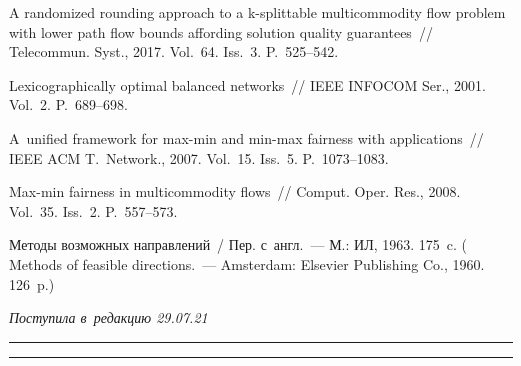 \begin{multicols}{2}
{{\begin{thebibliography}{9}
 A randomized rounding approach to a k-splittable 
multicommodity flow problem with lower path flow bounds affording solution 
quality guarantees~// Telecommun. Syst., 2017. Vol.~64. Iss.~3. P.~525--542.

Lexicographically optimal balanced networks~// IEEE \mbox{INFOCOM} Ser., 2001. 
Vol.~2.  P.~689--698.

  A~unified 
framework for max-min and min-max fairness with applications~// IEEE ACM 
T.~Network., 2007. Vol.~15. Iss.~5. P.~1073--1083.

   Max-min fairness 
in multicommodity flows~// Comput. Oper. Res., 2008. Vol.~35. Iss.~2. P.~557--573.


 Методы возможных на\-прав\-ле\-ний~/ Пер. с~англ.~--- М.: 
ИЛ, 1963. 175~c. ( Methods of feasible 
directions.~--- Amsterdam: Elsevier Publishing Co., 1960. 126~p.)

\end{thebibliography}

 }
 }

\end{multicols}

\vspace*{-9pt}

\hfill{\small\textit{Поступила в~редакцию 29.07.21}}

\vspace*{4pt}




\hrule

\vspace*{2pt}

\hrule

\vspace*{-4pt}

\def\tit{ANALYSIS OF PEAK LOAD DISTRIBUTION\\ IN~THE~MULTIUSER 
NETWORK}


\def\titkol{Analysis of peak load distribution in the multiuser network}


\def\aut{Yu.\,E.~Malashenko and I.\,A.~Nazarova}

